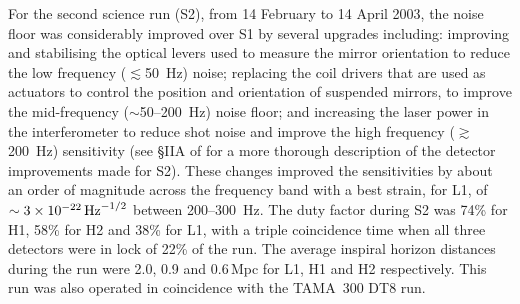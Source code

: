 \documentclass{article}
\begin{document}

For the second science run (S2), from 14 February to 14 April 2003, the noise
floor was considerably improved over S1 by several upgrades including:
improving and stabilising the optical levers used to measure the mirror
orientation to reduce the low frequency ($\lesssim$50~Hz) noise; replacing the
coil drivers that are used as actuators to control the position and
orientation of suspended mirrors, to improve the mid-frequency
($\sim$50--200~Hz) noise floor; and increasing the laser power in the
interferometer to reduce shot noise and improve the high frequency
($\gtrsim$200~Hz) sensitivity (see \S{}IIA of \cite{Abbott:2005a} for a more
thorough description of the detector improvements made for S2). These changes
improved the sensitivities by about an order of magnitude across the frequency
band with a best strain, for L1, of $\sim3\times10^{-22}\,{\rm Hz}^{-1/2}$
between 200--300~Hz. The duty factor during S2 was 74\% for H1, 58\% for H2 and
38\% for L1, with a triple coincidence time when all three detectors were in
lock of 22\% of the run. The average inspiral horizon distances during the run
were 2.0, 0.9 and 0.6\,Mpc for L1, H1 and H2 respectively. This run was also
operated in coincidence with the TAMA~300 DT8 run.
\end{document}
